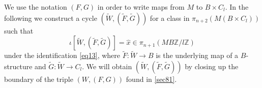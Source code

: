 \documentclass[12pt]{article}
\newcommand{\Z}{{\mathbb{Z}}}
\begin{document}
We 
 use 
the notation $(F,G)$ in order to write maps from $M$ to $B\times C_{l}$.
In the following we construct a cycle $(\tilde W,(\tilde F,\tilde G))$ for a class in
$\pi_{n+2}(M(B\times C_{l}))$
such that
$$\iota [\tilde W,(\tilde F,\tilde G)]=\hat x\in \pi_{n+1}(MB\Z/l\Z)$$
under the identification \eqref{eq13}, where
$\tilde F:\tilde W\to B$ is the underlying map of a $B$-structure   and $\tilde G :\tilde W\to C_{l}$.
We will obtain   $(\tilde W,(\tilde F,\tilde G))$ by closing up the boundary of the triple $(W,(F,G))$
found in \ref{sec81}. 
 
\end{document}
